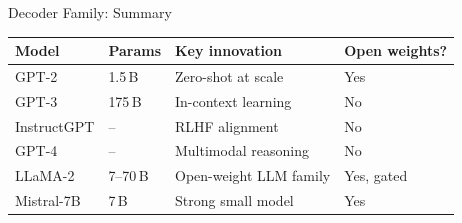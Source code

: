 \documentclass[11pt,aspectratio=169,professionalfonts]{beamer}
\begin{document}
\begin{frame}{Decoder Family: Summary}

  \begin{center}
  \renewcommand{\arraystretch}{1.3}
  \setlength{\tabcolsep}{3pt}

  \begin{tabular}{@{}llll@{}}
    \toprule
    \textbf{Model}
      & \textbf{Params}
      & \textbf{Key innovation}
      & \textbf{Open weights?} \\
    \midrule

    GPT-2
      & 1.5\,B
      & Zero-shot at scale
      & Yes \\

    GPT-3
      & 175\,B
      & In-context learning
      & No \\

    InstructGPT
      & --
      & RLHF alignment
      & No \\

    GPT-4
      & --
      & Multimodal reasoning
      & No \\

    LLaMA-2
      & 7--70\,B
      & Open-weight LLM family
      & Yes, gated \\

    Mistral-7B
      & 7\,B
      & Strong small model
      & Yes \\

    \bottomrule
  \end{tabular}

  \end{center}

\end{frame}%
%
\end{document}
